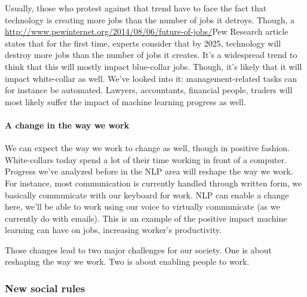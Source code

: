 \documentclass[12pt]{article}
\begin{document}
Usually, those who protest against that trend have to face the fact that technology is creating more jobs than the number of jobs it detroys. Though, a \url{http://www.pewinternet.org/2014/08/06/future-of-jobs/}{Pew Research article} states that for the first time, experts consider that by 2025, technology will destroy more jobs than the number of jobs it creates. It's a widespread trend to think that this will mostly impact blue-collar jobs. Though, it's likely that it will impact white-collar as well. We've looked into it: management-related tasks can for instance be automated. Lawyers, accountants, financial people, traders will most likely suffer the impact of machine learning progress as well.



\paragraph{A change in the way we work}

We can expect the way we work to change as well, though in positive fashion. White-collars today spend a lot of their time working in front of a computer. Progress we've analyzed before in the NLP area will reshape the way we work. For instance, most communication is currently handled through written form, we basically communicate with our keyboard for work. NLP can enable a change here, we'll be able to work using our voice to virtually communicate (as we currently do with emails). This is an example of the positive impact machine learning can have on jobs, increasing worker's productivity.

Those changes lead to two major challenges for our society. One is about reshaping the way we work. Two is about enabling people to work.

\subsubsection{New social rules}
\end{document}
